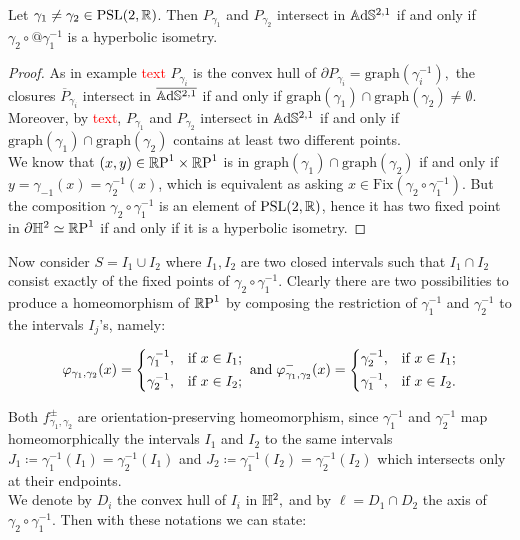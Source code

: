 \begin{lemma}\label{Mati}
    Let $\gamma_1\neq\gamma_2\in\PSL$. Then $P_{\gamma_1}$ and $P_{\gamma_2}$ intersect in $\A^{2,1}$ if and only if $\gamma_2\circ@{\gamma_1^{-1}}$ is a hyperbolic isometry. 
\end{lemma}
\begin{proof}
    As in example \textcolor{red}{text} $P_{\gamma_i}$ is the convex hull of $\partial P_{\gamma_i}=\text{graph}(\gamma_i^{-1}),$ the closures $\overline{P}_{\gamma_i}$  intersect in $\overline{\A^{2,1}}$ if and only if $\text{graph}(\gamma_1)\cap\text{graph}(\gamma_2)\neq\emptyset$. Moreover, by \textcolor{red}{text}, $P_{\gamma_1}$ and $P_{\gamma_2}$ intersect in $\A^{2,1}$ if and only if $\text{graph}(\gamma_1)\cap\text{graph}(\gamma_2)$ contains at least two different points. \\
    We know that $(x,y)\in\T$ is in $\text{graph}(\gamma_1)\cap\text{graph}(\gamma_2)$ if and only if $y=\gamma_{-1}(x)=\gamma_2^{-1}(x)$, which is equivalent as asking $x\in\text{Fix}(\gamma_2\circ\gamma_1^{-1})$. But the composition $\gamma_2\circ\gamma_1^{-1}$ is an element of $\PSL$, hence it has two fixed point in $\partial\H^2\simeq\S$ if and only if it is a hyperbolic isometry.
\end{proof}

Now consider $S=I_1\cup I_2$ where $I_1,I_2$ are two closed intervals such that $I_1\cap I_2$ consist exactly of the fixed points of $\gamma_2\circ\gamma_1^{-1}.$ Clearly there are two possibilities to produce a homeomorphism of $\S$ by composing the restriction of $\gamma_1^{-1}$ and $\gamma_2^{-1}$ to the intervals $I_j$'s, namely: 

\begin{equation}
    \varphi_{\gamma_1,\gamma_2}(x) = \begin{dcases}
        \gamma_1^{-1}, & \text{if } x \in I_1; \\
        \gamma_2^{-1}, & \text{if } x \in I_2;
    \end{dcases}
    \;\text{and}\;
    \varphi^-_{\gamma_1,\gamma_2}(x) = \begin{dcases}
        \gamma_2^{-1}, & \text{if } x \in I_1 ;\\
        \gamma_1^{-1} , & \text{if } x \in I_2.
    \end{dcases}
    \end{equation}
    
Both $f_{\gamma_1,\gamma_2}^{\pm}$ are orientation-preserving homeomorphism, since $\gamma_1^{-1}$ and $\gamma_2^{-1}$ map homeomorphically the intervals $I_1$ and $I_2$ to the same intervals $J_1\coloneqq\gamma_1^{-1}(I_1)=\gamma_2^{-1}(I_1)$ and $J_2\coloneqq\gamma_1^{-1}(I_2)=\gamma_2^{-1}(I_2)$ which intersects only at their endpoints. \\
We denote by $D_i$ the convex hull of $I_i$ in $\H^2,$ and by $\ell=D_1\cap D_2$ the axis of $\gamma_2\circ\gamma_1^{-1}$. Then with these notations we can state: 

